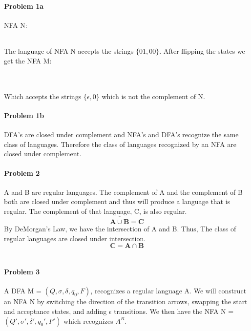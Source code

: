 \documentclass[a4paper, 12pt]{article}
\begin{document}
\noindent\large\textbf{Problem 1a}
\\
\\
NFA N$\colon$
\\
\\
The language of NFA N accepts the strings $\{01, 00\}$. After flipping the states we get the NFA M$\colon$
\\
\\
\\
Which accepts the strings $\{\epsilon, 0\}$ which is not the complement of N.
\\
\\
\noindent\large\textbf{Problem 1b}
\\
\\
DFA's are closed under complement and NFA's and DFA's recognize the same class of languages.  Therefore the class of languages recognized by an NFA are closed under complement.
\\
\\
\noindent\large\textbf{Problem 2}
\\
\\
A and B are regular languages. The complement of A and the complement of B both are closed under complement and thus will produce a language that is regular.  The complement of that language, C, is also regular. 
\[\overline{\overline{\textbf{A}} \cup \overline{\textbf{B}}} = \textbf{C}\]
By DeMorgan's Law, we have the intersection of A and B. Thus, The class of regular languages are closed under intersection. 
\[\textbf{C} = \textbf{A} \cap \textbf{B}\]
\\
\\
\noindent\large\textbf{Problem 3}
\\
\\
A DFA M = $\left(Q, \sigma, \delta, q_{0}, F\right)$, recognizes a regular language A. We will construct an NFA N by switching the direction of the transition arrows, swapping the start and acceptance states, and adding $\epsilon$ transitions. We then have the NFA N = $\left( Q\prime, \sigma\prime, \delta\prime, q_{0}\prime, F\prime \right)$ which recognizes $A^{R}$.
\end{document}
